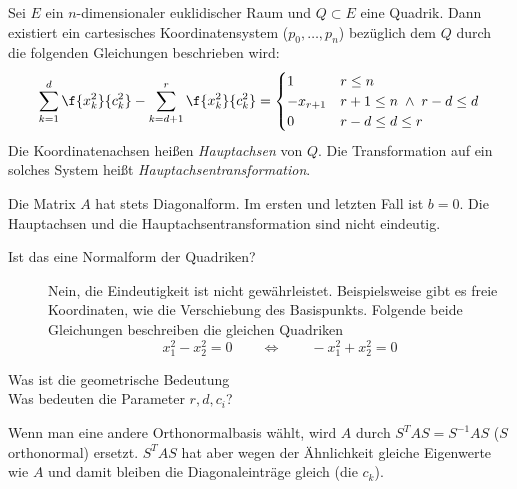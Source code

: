 \documentclass{mycourse}
\begin{document}
\begin{thm}
	\label{thm:14.3}
	Sei $E$ ein $n$-dimensionaler euklidischer Raum und $Q\subset E$ eine Quadrik.
	Dann existiert ein cartesisches Koordinatensystem ($p_0,\dotsc, p_n$) bezüglich dem $Q$ durch die folgenden Gleichungen beschrieben wird:
	\begin{align*}
	\sum_{k=1}^d\f{x_k^2}{c_k^2} - \sum_{k=d+1}^r \f{x_{k}^2}{c_k^2} = \begin{cases}
		1 & r \le n\\
		-x_{r+1} & r+1 \le n \;\land\; r-d \le d\\
		0 & r-d \le d \le r
	\end{cases}
	\end{align*}
	Die Koordinatenachsen heißen \emph{Hauptachsen} von $Q$.
	Die Transformation auf ein solches System heißt \emph{Hauptachsentransformation}.
	\begin{note}
		Die Matrix $A$ hat stets Diagonalform.
		Im ersten und letzten Fall ist $b=0$. 
		Die Hauptachsen und die Hauptachsentransformation sind nicht eindeutig.
	\end{note}
\end{thm}

\begin{seg}[Fragen]
	\begin{description}
		\item[Ist das eine Normalform der Quadriken?]
			Nein, die Eindeutigkeit ist nicht gewährleistet.
			Beispielsweise gibt es freie Koordinaten, wie die Verschiebung des Basispunkts.
			Folgende beide Gleichungen beschreiben die gleichen Quadriken
			\[
				x_1^2 - x_2^2 = 0 \qquad \iff  \qquad -x_1^2 + x_2^2 = 0
			\]
		\item[Was ist die geometrische Bedeutung]

		\item[Was bedeuten die Parameter $r,d,c_i$?]
	\end{description}
\end{seg}

Wenn man eine andere Orthonormalbasis wählt, wird $A$ durch $S^TAS = S^{-1}AS$ ($S$ orthonormal) ersetzt.
$S^TAS$ hat aber wegen der Ähnlichkeit gleiche Eigenwerte wie $A$ und damit bleiben die Diagonaleinträge gleich (die $c_k$).
\end{document}
